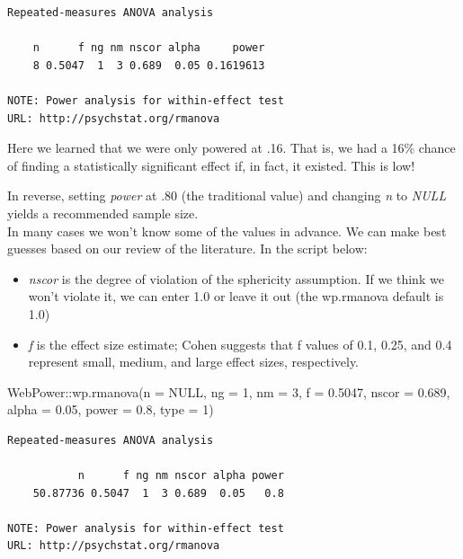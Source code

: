 \documentclass[
  11pt,
]{book}
\newenvironment{Shaded}{\begin{snugshade}}{\end{snugshade}}
\newcommand{\AttributeTok}[1]{\textcolor[rgb]{0.77,0.63,0.00}{#1}}
\newcommand{\ConstantTok}[1]{\textcolor[rgb]{0.00,0.00,0.00}{#1}}
\newcommand{\DecValTok}[1]{\textcolor[rgb]{0.00,0.00,0.81}{#1}}
\newcommand{\FloatTok}[1]{\textcolor[rgb]{0.00,0.00,0.81}{#1}}
\newcommand{\FunctionTok}[1]{\textcolor[rgb]{0.00,0.00,0.00}{#1}}
\newcommand{\NormalTok}[1]{#1}
\newcommand{\SpecialCharTok}[1]{\textcolor[rgb]{0.00,0.00,0.00}{#1}}
\providecommand{\tightlist}{%
  \setlength{\itemsep}{0pt}\setlength{\parskip}{0pt}}
\begin{document}
\begin{verbatim}
Repeated-measures ANOVA analysis

    n      f ng nm nscor alpha     power
    8 0.5047  1  3 0.689  0.05 0.1619613

NOTE: Power analysis for within-effect test
URL: http://psychstat.org/rmanova
\end{verbatim}

Here we learned that we were only powered at .16. That is, we had a 16\% chance of finding a statistically significant effect if, in fact, it existed. This is low!

In reverse, setting \emph{power} at .80 (the traditional value) and changing \emph{n} to \emph{NULL} yields a recommended sample size.\\
In many cases we won't know some of the values in advance. We can make best guesses based on our review of the literature. In the script below:

\begin{itemize}
\tightlist
\item
  \emph{nscor} is the degree of violation of the sphericity assumption. If we think we won't violate it, we can enter 1.0 or leave it out (the wp.rmanova default is 1.0)
\item
  \emph{f} is the effect size estimate; Cohen suggests that f values of 0.1, 0.25, and 0.4 represent small, medium, and large effect sizes, respectively.
\end{itemize}

\begin{Shaded}
\begin{Highlighting}[]
\NormalTok{WebPower}\SpecialCharTok{::}\FunctionTok{wp.rmanova}\NormalTok{(}\AttributeTok{n =} \ConstantTok{NULL}\NormalTok{, }\AttributeTok{ng =} \DecValTok{1}\NormalTok{, }\AttributeTok{nm =} \DecValTok{3}\NormalTok{, }\AttributeTok{f =} \FloatTok{0.5047}\NormalTok{, }\AttributeTok{nscor =} \FloatTok{0.689}\NormalTok{,}
    \AttributeTok{alpha =} \FloatTok{0.05}\NormalTok{, }\AttributeTok{power =} \FloatTok{0.8}\NormalTok{, }\AttributeTok{type =} \DecValTok{1}\NormalTok{)}
\end{Highlighting}
\end{Shaded}

\begin{verbatim}
Repeated-measures ANOVA analysis

           n      f ng nm nscor alpha power
    50.87736 0.5047  1  3 0.689  0.05   0.8

NOTE: Power analysis for within-effect test
URL: http://psychstat.org/rmanova
\end{verbatim}
\end{document}
